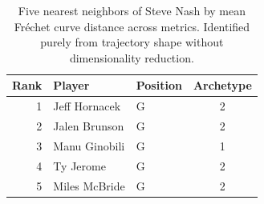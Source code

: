 \begin{table}[htbp]
  \centering\small
  \begin{tabular}{rllc}
    \toprule
    Rank & Player & Position & Archetype \\
    \midrule
    1 & Jeff Hornacek & G & 2 \\
    2 & Jalen Brunson & G & 2 \\
    3 & Manu Ginobili & G & 1 \\
    4 & Ty Jerome & G & 2 \\
    5 & Miles McBride & G & 2 \\
    \bottomrule
  \end{tabular}
  \caption{Five nearest neighbors of Steve Nash by mean Fr\'{e}chet curve distance across metrics. Identified purely from trajectory shape without dimensionality reduction.}
  \label{tab:Steve_Nash_frechet_curve_neighbors}
\end{table}

